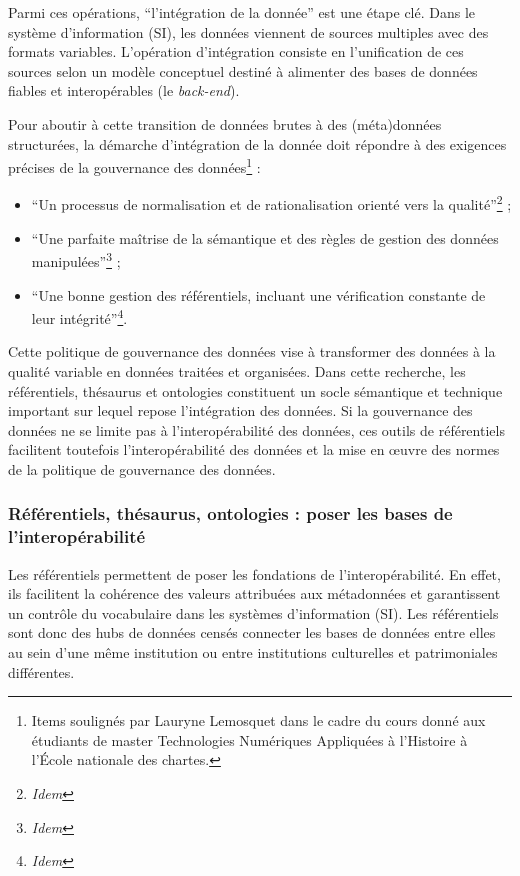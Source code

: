Parmi ces opérations, \enquote{l’intégration de la donnée} est une étape clé. Dans le système d’information (SI), les données viennent de sources multiples avec des formats variables. L’opération d’intégration consiste en l’unification de ces sources selon un modèle conceptuel destiné à alimenter des bases de données fiables et interopérables (le \textit{back-end}).

Pour aboutir à cette transition de données brutes à des (méta)données structurées, la démarche d’intégration de la donnée doit répondre à des exigences précises de la gouvernance des données\footnote{Items soulignés par Lauryne Lemosquet dans le cadre du cours donné aux étudiants de master Technologies Numériques Appliquées à l'Histoire à l'École nationale des chartes.} :
\begin{itemize}
	\item \enquote{Un processus de normalisation et de rationalisation orienté vers la qualité}\footnote{\textit{Idem}} ;
	\item \enquote{Une parfaite maîtrise de la sémantique et des règles de gestion des données manipulées}\footnote{\textit{Idem}} ;
	\item \enquote{Une bonne gestion des référentiels, incluant une vérification constante de leur intégrité}\footnote{\textit{Idem}}.
\end{itemize}

Cette politique de gouvernance des données vise à transformer des données à la qualité variable en données traitées et organisées. Dans cette recherche, les référentiels, thésaurus et ontologies constituent un socle sémantique et technique important sur lequel repose l'intégration des données. Si la gouvernance des données ne se limite pas à l'interopérabilité des données, ces outils de référentiels facilitent toutefois l'interopérabilité des données et la mise en œuvre des normes de la politique de gouvernance des données.

\subsubsection*{Référentiels, thésaurus, ontologies : poser les bases de l'interopérabilité}

Les référentiels permettent de poser les fondations de l’interopérabilité. En effet, ils facilitent la cohérence des valeurs attribuées aux métadonnées et garantissent un contrôle du vocabulaire dans les systèmes d’information (SI). Les référentiels sont donc des hubs de données censés connecter les bases de données entre elles au sein d’une même institution ou entre institutions culturelles et patrimoniales différentes.

